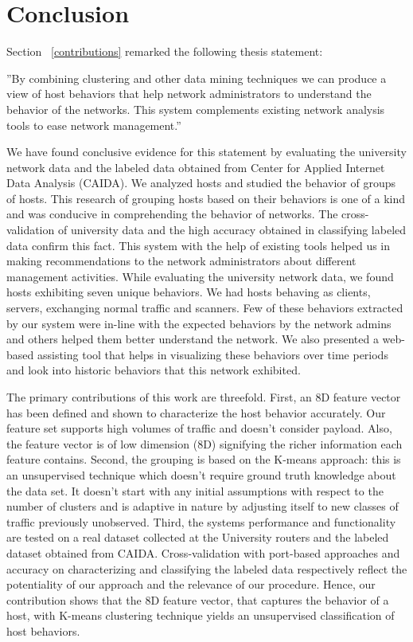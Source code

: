 
\chapter{Conclusion} \label{chap:conclusion}

Section ~\ref{contributions} remarked the following thesis statement:

''By combining clustering and other data mining techniques we can produce a view of host behaviors that help network administrators to understand the behavior of the networks. This system complements existing network analysis tools to ease network management.''

We have found conclusive evidence for this statement by evaluating the university network data and the labeled data obtained from Center for Applied Internet Data Analysis (CAIDA). We analyzed hosts and studied the behavior of groups of hosts. This research of grouping hosts based on their behaviors is one of a kind and was conducive in comprehending the behavior of networks. The cross-validation of university data and the high accuracy obtained in classifying labeled data confirm this fact. This system with the help of existing tools helped us in making recommendations to the network administrators about different management activities. While evaluating the university network data, we found hosts exhibiting seven unique behaviors. We had hosts behaving as clients, servers, exchanging normal traffic and scanners. Few of these behaviors extracted by our system were in-line with the expected behaviors by the network admins and others helped them better understand the network. We also presented a web-based assisting tool that helps in visualizing these behaviors over time periods and look into historic behaviors that this network exhibited.

The primary contributions of this work are threefold. First, an 8D feature vector has been defined and shown to characterize the host behavior accurately. Our feature set supports high volumes of traffic and doesn't consider payload. Also, the feature vector is of low dimension (8D) signifying the richer information each feature contains.
Second, the grouping is based on the K-means approach: this is an unsupervised technique which doesn't require ground truth knowledge about the data set. It doesn't start with any initial assumptions with respect to the number of clusters and is adaptive in nature by adjusting itself to new classes of traffic previously unobserved. Third, the systems performance and functionality are tested on a real dataset collected at the University routers and the labeled dataset obtained from CAIDA. Cross-validation with port-based approaches and accuracy on characterizing and classifying the labeled data respectively reflect the potentiality of our approach and the relevance of our procedure.
Hence, our contribution shows that the 8D feature vector, that captures the behavior of a host, with K-means clustering technique
yields an unsupervised classification of host behaviors.

